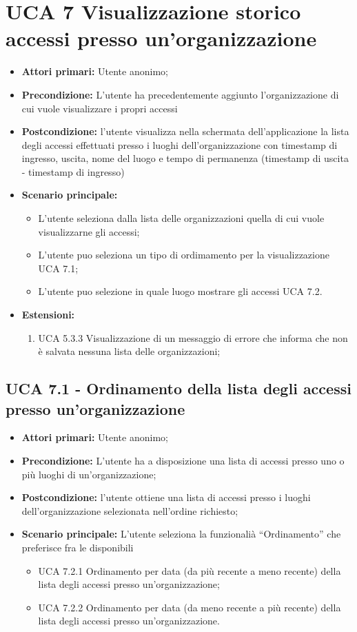 \section{UCA 7 Visualizzazione storico accessi presso un’organizzazione}%
\begin{itemize}
\item \textbf{Attori primari:} Utente anonimo;
\item \textbf{Precondizione:} L’utente ha precedentemente aggiunto l’organizzazione di cui vuole visualizzare i propri accessi 
\item \textbf{Postcondizione:} l’utente visualizza nella schermata dell’applicazione la lista degli accessi effettuati presso i luoghi dell’organizzazione con timestamp di ingresso, uscita, nome del luogo e tempo di permanenza (timestamp di uscita - timestamp di ingresso)
\item \textbf{Scenario principale:} 
\begin{itemize}
\item L’utente seleziona dalla lista delle organizzazioni quella di cui vuole visualizzarne gli accessi;
\item L'utente puo seleziona un tipo di ordimamento per la visualizzazione UCA 7.1;
\item L'utente puo selezione in quale luogo mostrare gli accessi UCA 7.2.
\end{itemize}
\item \textbf{Estensioni:}
\begin{enumerate}
	\item UCA 5.3.3 Visualizzazione di un messaggio di errore che informa che non è salvata nessuna lista delle organizzazioni;	
\end{enumerate}	
\end{itemize}


\subsection{UCA 7.1 - Ordinamento della lista degli accessi presso un’organizzazione}%
\begin{itemize}
\item \textbf{Attori primari:} Utente anonimo;
\item \textbf{Precondizione:} L’utente ha a disposizione una lista di accessi presso uno o più luoghi di un'organizzazione;
\item \textbf{Postcondizione:} l’utente ottiene una lista di accessi presso i luoghi dell’organizzazione selezionata nell’ordine richiesto;
\item \textbf{Scenario principale:} L’utente seleziona la funzionalià “Ordinamento” che preferisce fra le disponibili
	\begin{itemize}
	\item UCA 7.2.1 Ordinamento per data (da più recente a meno recente) della lista degli accessi presso un’organizzazione;
	\item UCA 7.2.2 Ordinamento per data (da meno recente a più recente) della lista degli accessi presso un’organizzazione.
	\end{itemize}
\end{itemize}

